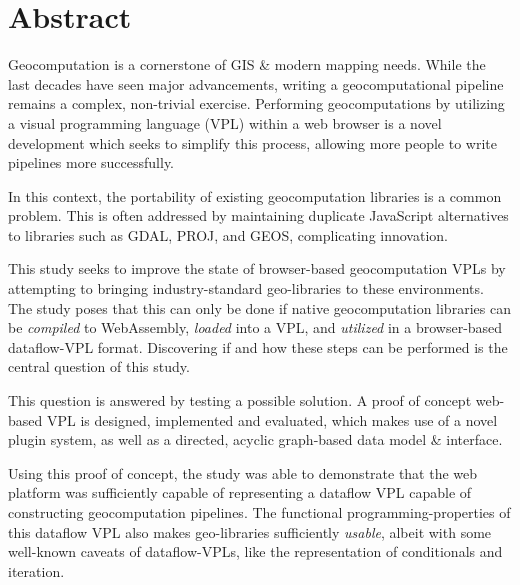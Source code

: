 \chapter*{Abstract}
Geocomputation is a cornerstone of GIS \& modern mapping needs.
While the last decades have seen major advancements, writing a geocomputational pipeline remains a complex, non-trivial exercise. 
Performing geocomputations by utilizing a visual programming language (VPL) within a web browser is a novel development which seeks to simplify this process, allowing more people to write pipelines more successfully.

In this context, the portability of existing geocomputation libraries is a common problem.
This is often addressed by maintaining duplicate JavaScript alternatives to libraries such as GDAL, PROJ, and GEOS, complicating innovation.  

This study seeks to improve the state of browser-based geocomputation VPLs by attempting to bringing industry-standard geo-libraries to these environments. 
The study poses that this can only be done if native geocomputation libraries can be \emph{compiled} to WebAssembly, \emph{loaded} into a VPL, and \emph{utilized} in a browser-based dataflow-VPL format.
Discovering if and how these steps can be performed is the central question of this study. 

This question is answered by testing a possible solution.
A proof of concept web-based VPL is designed, implemented and evaluated, which makes use of a novel plugin system, as well as a directed, acyclic graph-based data model \& interface.

Using this proof of concept, the study was able to demonstrate that the web platform was sufficiently capable of representing a dataflow VPL capable of constructing geocomputation pipelines.
The functional programming-properties of this dataflow VPL also makes geo-libraries sufficiently \emph{usable}, albeit with some well-known caveats of dataflow-VPLs, like the representation of conditionals and iteration.  

